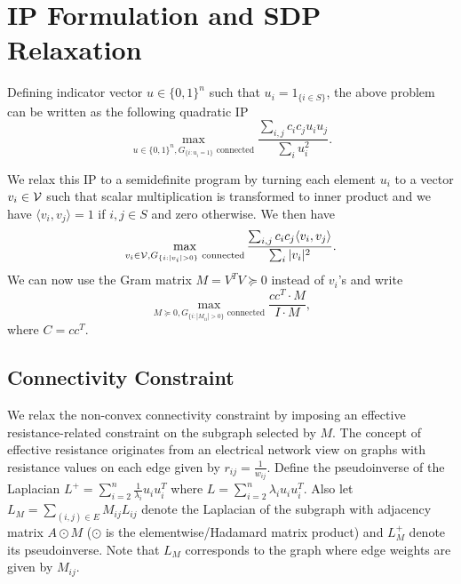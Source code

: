 \documentclass{article}
\begin{document}

\section{IP Formulation and SDP Relaxation}

Defining indicator vector $u \in \{0,1\}^n$ such that $u_i = 1_{\{i \in S\}}$, the above problem can be written as the following quadratic IP
\begin{equation}\label{eq:original_u2}
  \max_{u \in \{0,1\}^n, G_{\{i: u_i = 1\}} \text{ connected}} \frac{\sum_{i,j} c_i c_j u_i u_j}{\sum_i u_i^2}.
\end{equation}

We relax this IP to a semidefinite program by turning each element $u_i$ to a vector $v_i \in {\cal V}$ such that scalar multiplication is transformed to inner product and we have $\langle v_i, v_j \rangle = 1$ if $i,j \in S$ and zero otherwise. We then have
\begin{equation}\label{eq:original_v}
  \max_{v_i \in {\cal V}, G_{\{i: |v_i| > 0\}} \text{ connected}} \frac{\sum_{i,j} c_i c_j \langle v_i, v_j \rangle}{\sum_i |v_i|^2}.
\end{equation}
%
We can now use the Gram matrix $M = V^T V \succeq 0$ instead of $v_i$'s and write
\begin{equation}\label{eq:M}
  \max_{M \succeq 0, G_{\{i: |M_{ii}| > 0\}} \text{ connected}} \frac{cc^T \cdot M}{I \cdot M},
\end{equation}
where $C = c c^T$. 

\subsection{Connectivity Constraint}

We relax the non-convex connectivity constraint by imposing an effective resistance-related constraint on the subgraph selected by $M$. The concept of effective resistance originates from an electrical network view on graphs with resistance values on each edge given by $r_{ij} = \frac{1}{w_{ij}}$. Define the pseudoinverse of the Laplacian $L^+ = \sum_{i=2}^n \frac{1}{\lambda_i} u_i u_i^T$ where $L = \sum_{i=2}^n \lambda_i u_i u_i^T$. Also let $L_M = \sum_{(i,j) \in E} M_{ij} L_{ij}$ denote the Laplacian of the subgraph with adjacency matrix $A \odot M$ ($\odot$ is the elementwise/Hadamard matrix product) and $L^+_M$ denote its pseudoinverse. Note that $L_M$ corresponds to the graph where edge weights are given by $M_{ij}$.  %
\end{document}
